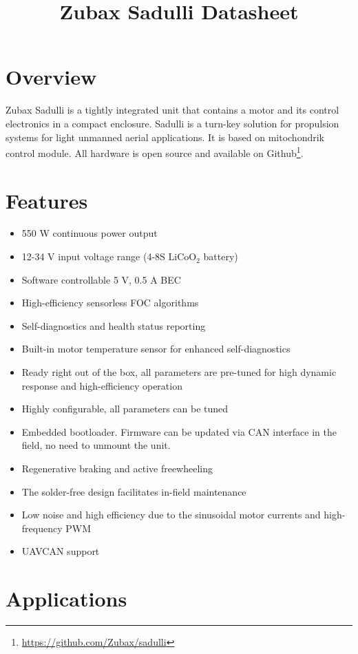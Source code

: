 \documentclass{document_templates/documentation_template_latex/zubaxdoc}
\title{Zubax Sadulli Datasheet}
\begin{document}
\frontmatter
\begin{titlepage}

\section*{Overview}

Zubax Sadulli is a tightly integrated unit that contains a motor and its control electronics in a compact enclosure. 
Sadulli is a turn-key solution for propulsion systems for light unmanned aerial applications. 
It is based on \mbox{mitochondrik} control module. 
All hardware is open source and available on Github\footnote{\url{https://github.com/Zubax/sadulli}}.

\section*{Features}

\begin{itemize}
    \item 550 W continuous power output
    \item 12-34 V input voltage range (4-8S $\text{LiCoO}_\text{2}$ battery)
    \item Software controllable 5 V, 0.5 A BEC
    \item High-efficiency sensorless FOC algorithms
    \item Self-diagnostics and health status reporting
    \item Built-in motor temperature sensor for enhanced self-diagnostics
    \item Ready right out of the box, all parameters are pre-tuned for high dynamic response and high-efficiency operation
    \item Highly configurable, all parameters can be tuned
    \item Embedded bootloader. Firmware can be updated via CAN interface in the field, no need to unmount the unit.
    \item Regenerative braking and active freewheeling
    \item The solder-free design facilitates in-field maintenance
    \item Low noise and high efficiency due to the sinusoidal \mbox{motor} currents and high-frequency PWM
    \item UAVCAN support
\end{itemize}

\section*{Applications}


\end{titlepage}
\end{document}
